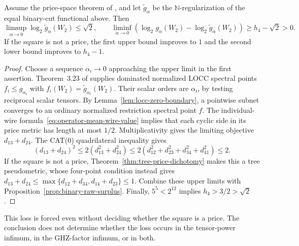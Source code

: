 \begin{corollary}
\label{cor:binary-regularization-loss}
Assume the price-space theorem of
\cite[Proposition~C.3]{Anthropic2026}, and let
$\widetilde g_\alpha$ be the $\mathbb N$-regularization of the
equal binary-cut functional above. Then
\[
 \limsup_{\alpha\to0}\log_2\widetilde g_\alpha(W_2)\leq\sqrt2,
 \qquad
 \liminf_{\alpha\to0}
 \left(\log_2g_\alpha(W_2)-\log_2\widetilde g_\alpha(W_2)\right)
 \geq h_4-\sqrt2>0.
\]
If the square is not a price, the first upper bound improves to $1$
and the second lower bound improves to $h_4-1$.
\end{corollary}
\begin{proof}
Choose a sequence $\alpha_i\to0$ approaching the upper limit in
the first assertion. Theorem~3.23 of \cite{BugarVrana2025} supplies
dominated normalized LOCC spectral points $f_i\leq g_{\alpha_i}$
with $f_i(W_2)=\widetilde g_{\alpha_i}(W_2)$.
Their scalar orders are $\alpha_i$, by testing reciprocal scalar
tensors. By Lemma~\ref{lem:locc-zero-boundary}, a pointwise subnet
converges to an ordinary normalized restriction spectral point $f$.
The individual-wire formula~\eqref{eq:operator-mean-wire-value}
implies that each cyclic side in its price metric has length at most
$1/2$. Multiplicativity gives the limiting objective $d_{13}+d_{24}$.
The CAT(0) quadrilateral inequality gives
\[
 (d_{13}+d_{24})^2
 \leq2(d_{13}^2+d_{24}^2)
 \leq2(d_{12}^2+d_{23}^2+d_{34}^2+d_{41}^2)
 \leq2.
\]
If the square is not a price, Theorem~\ref{thm:tree-price-dichotomy}
makes this a tree pseudometric, whose four-point condition instead
gives
$d_{13}+d_{24}\leq\max\{d_{12}+d_{34},d_{14}+d_{23}\}\leq1$.
Combine these upper limits with Proposition~\ref{prop:binary-raw-surplus}.
Finally, $5^5<2^{12}$ implies $h_4>3/2>\sqrt2$.
\end{proof}

This loss is forced even without deciding whether the square is a
price. The conclusion does not determine whether the loss occurs
in the tensor-power infimum, in the GHZ-factor infimum, or in both.
